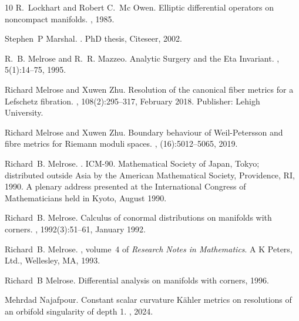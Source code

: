 \documentclass[a4paper,11pt]{article}
\begin{document}
\begin{thebibliography}{10}
R.~Lockhart and Robert C.~Mc Owen.
\newblock Elliptic differential operators on noncompact manifolds.
, 1985.

Stephen~P Marshal.
.
\newblock PhD thesis, Citeseer, 2002.

R.~B. Melrose and R.~R. Mazzeo.
\newblock Analytic {Surgery} and the {Eta} {Invariant}.
, 5(1):14--75, 1995.

Richard Melrose and Xuwen Zhu.
\newblock Resolution of the canonical fiber metrics for a {Lefschetz} fibration.
, 108(2):295--317, February 2018.
\newblock Publisher: Lehigh University.

Richard Melrose and Xuwen Zhu.
\newblock Boundary behaviour of {W}eil-{P}etersson and fibre metrics for
  {R}iemann moduli spaces.
, (16):5012--5065, 2019.

Richard~B. Melrose.
.
\newblock ICM-90. Mathematical Society of Japan, Tokyo; distributed outside Asia by the American Mathematical Society, Providence, RI, 1990.
\newblock A plenary address presented at the International Congress of Mathematicians held in Kyoto, August 1990.

Richard~B. Melrose.
\newblock Calculus of conormal distributions on manifolds with corners.
, 1992(3):51--61, January 1992.

Richard~B. Melrose.
, volume~4 of {\em Research Notes in Mathematics}.
\newblock A K Peters, Ltd., Wellesley, MA, 1993.

Richard~B Melrose.
\newblock Differential analysis on manifolds with corners, 1996.

Mehrdad Najafpour.
\newblock Constant scalar curvature {K}{\"a}hler metrics on resolutions of an orbifold singularity of depth 1.
, 2024.


\end{thebibliography}
\end{document}
